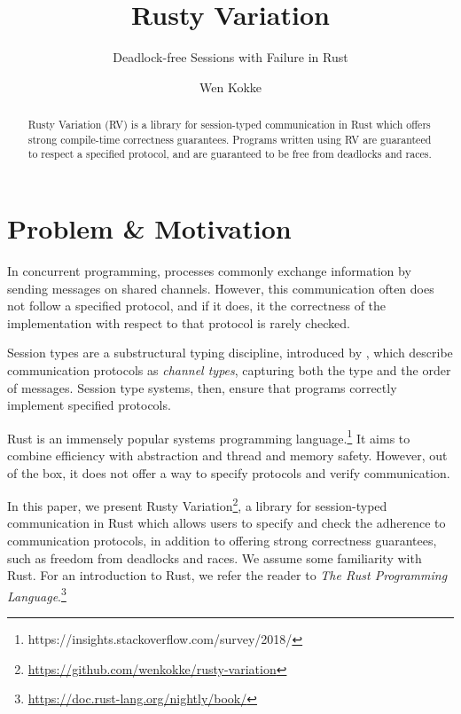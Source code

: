 \documentclass[sigconf,natbib=false]{acmart}
\begin{document}
\title{Rusty Variation}
\subtitle{Deadlock-free Sessions with Failure in Rust}
\author{Wen Kokke}

\begin{abstract}
  Rusty Variation (RV) is a library for session-typed communication in Rust which offers strong compile-time correctness guarantees. Programs written using RV are guaranteed to respect a specified protocol, and are guaranteed to be free from deadlocks and races.
\end{abstract}

\maketitle

\section{Problem \& Motivation}
In concurrent programming, processes commonly exchange information by sending messages on shared channels. However, this communication often does not follow a specified protocol, and if it does, it the correctness of the implementation with respect to that protocol is rarely checked.

Session types are a substructural typing discipline, introduced by \textcite{honda1993}, which describe communication protocols as \emph{channel types}, capturing both the type and the order of messages. Session type systems, then, ensure that programs correctly implement specified protocols.

Rust is an immensely popular systems programming language.\footnote{https://insights.stackoverflow.com/survey/2018/} It aims to combine efficiency with abstraction and thread and memory safety. However, out of the box, it does not offer a way to specify protocols and verify communication.

In this paper, we present Rusty Variation\footnote{\url{https://github.com/wenkokke/rusty-variation}}, a library for session-typed communication in Rust which allows users to specify and check the adherence to communication protocols, in addition to offering strong correctness guarantees, such as freedom from deadlocks and races.
We assume some familiarity with Rust. For an introduction to Rust, we refer the reader to \textit{The Rust Programming Language}.\footnote{\url{https://doc.rust-lang.org/nightly/book/}}
\end{document}
